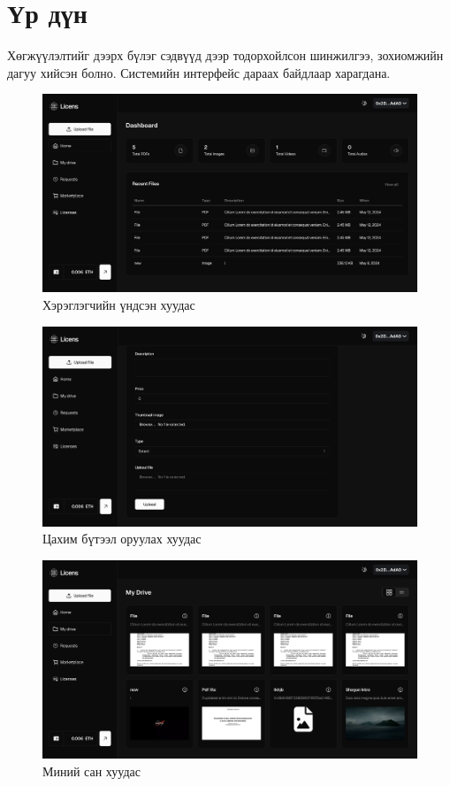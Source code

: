 \newpage
\section{Үр дүн}
Хөгжүүлэлтийг дээрх бүлэг сэдвүүд дээр тодорхойлсон шинжилгээ, зохиомжийн дагуу хийсэн болно. Системийн интерфейс дараах байдлаар харагдана.
\begin{figure}[h!]
	\centering
	\includegraphics[scale=0.15]{src/images/dashboard.png}
	\caption{Хэрэглэгчийн үндсэн хуудас}
\end{figure}

\begin{figure}[h!]
	\centering
	\includegraphics[scale=0.15]{src/images/upload.png}
	\caption{Цахим бүтээл оруулах хуудас}
\end{figure}

\begin{figure}[h!]
	\centering
	\includegraphics[scale=0.16]{src/images/drive.png}
	\caption{Миний сан хуудас}
\end{figure}

